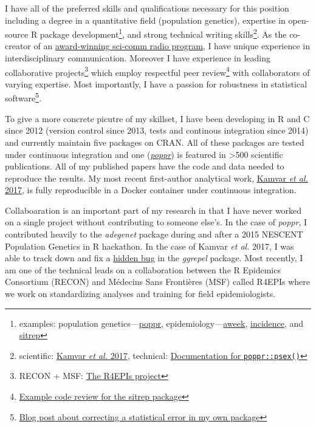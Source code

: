 I have all of the preferred skills and qualifications necessary for this
position including a degree in a quantitative field (population genetics),
expertise in open-source R package development\footnote{examples: population
genetics---\href{https://grunwaldlab.github.io/poppr}{poppr},
epidemiology---\href{https://www.repidemicsconsortium.org/aweek}{aweek}, \href{https://www.repidemicsconsortium.org/incidence}{incidence}, and
\href{https://github.com/R4EPI/sitrep}{sitrep}}, and strong technical writing
skills\footnote{scientific: \href{https://peerj.com/articles/4152/}{Kamvar
\textit{et al.} 2017}, technical:
\href{https://grunwaldlab.github.io/poppr/reference/psex.html}{Documentation
for \texttt{poppr::psex()}}}.
As the co-creator of an
\href{https://blogs.oregonstate.edu/inspiration}{award-winning sci-comm radio
program}, I have unique experience in interdisciplinary communication.  
Moreover I have experience in leading collaborative projects\footnote{RECON + MSF:
\href{https://R4EPIs.netlify.com}{The R4EPIs project}} which employ respectful
peer review\footnote{\href{https://github.com/R4EPI/sitrep/pull/76}{Example
code review for the sitrep package}} with collaborators of varying expertise.
Most importantly, I have a passion for robustness in statistical
software\footnote{\href{https://zkamvar.netlify.com/post/2017-09-23-squish/squish}{Blog
post about correcting a statistical error in my own package}}.

\vspace{1ex}


To give a more concrete picutre of my skillset, I have been developing in R and
C since 2012 (version control since 2013, tests and continous integration since 
2014) and currently maintain five packages on CRAN. All of these packages are
tested under continuous integration and one
(\href{https://grunwaldlab.github.io/poppr}{\textit{poppr}}) is featured in
\textgreater500 scientific publications. All of my published papers have the
code and data needed to reproduce the results. My most recent first-author 
analytical work, \href{https://peerj.com/articles/4152/}{Kamvar \textit{et al.}
2017}, is fully reproducible in a Docker container under continuous integration. 

\vspace{1ex}

Collaboaration is an important part of my research in that I have never worked
on a single project without contributing to someone else's. In the case of
\textit{poppr}, I contributed heavily to the \textit{adegenet} package during
and after a 2015 NESCENT Population Genetics in R hackathon. In the case of
Kamvar \textit{et al.} 2017, I was able to track down and fix a
\href{https://github.com/slowkow/ggrepel/issues/72}{hidden bug} in the
\textit{ggrepel} package. Most recently, I am one of the technical leads on a
collaboration between the R Epidemics Consortium (RECON) and M\'{e}decins Sans
Fronti\`{e}res (MSF) called R4EPIs where we work on standardizing analyses and
training for field epidemiologists.  

